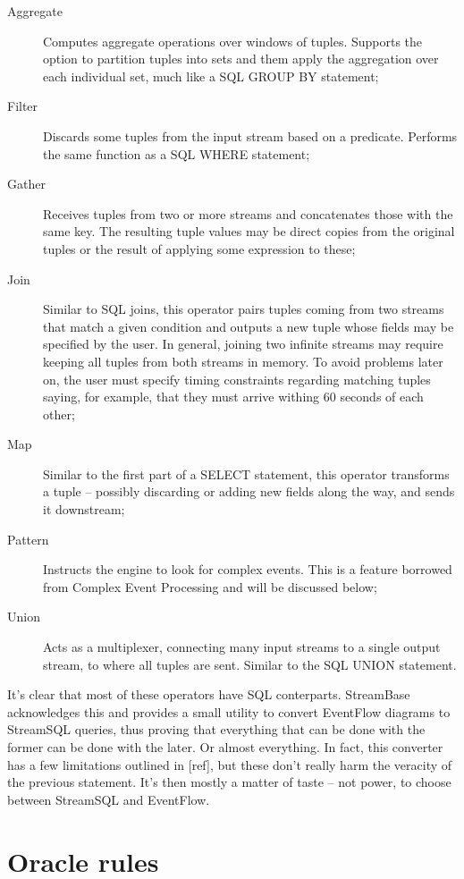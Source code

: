 \documentclass[twoside]{report}
\begin{document}
\begin{description}
\item [Aggregate] Computes aggregate operations over windows of tuples. Supports the option to partition tuples into sets and them apply the aggregation over each individual set, much like a SQL GROUP BY statement;
\item [Filter] Discards some tuples from the input stream based on a predicate. Performs the same function as a SQL WHERE statement;
\item [Gather] Receives tuples from two or more streams and concatenates those with the same key. The resulting tuple values may be direct copies from the original tuples or the result of applying some expression to these;
\item [Join] Similar to SQL joins, this operator pairs tuples coming from two streams that match a given condition and outputs a new tuple whose fields may be specified by the user. In general, joining two infinite streams may require keeping all tuples from both streams in memory. To avoid problems later on, the user must specify timing constraints regarding matching tuples saying, for example, that they must arrive withing 60 seconds of each other;
\item [Map] Similar to the first part of a SELECT statement, this operator transforms a tuple -- possibly discarding or adding new fields along the way, and sends it downstream;
\item [Pattern] Instructs the engine to look for complex events. This is a feature borrowed from Complex Event Processing and will be discussed below;
\item [Union] Acts as a multiplexer, connecting many input streams to a single output stream, to where all tuples are sent. Similar to the SQL UNION statement.
\end{description}

It's clear that most of these operators have SQL conterparts. StreamBase acknowledges this and provides a small utility to convert EventFlow diagrams to StreamSQL queries, thus proving that everything that can be done with the former can be done with the later. Or almost everything. In fact, this converter has a few limitations outlined in [ref], but these don't really harm the veracity of the previous statement. It's then mostly a matter of taste -- not power, to choose between StreamSQL and EventFlow.

\section{Oracle rules}
\end{document}
